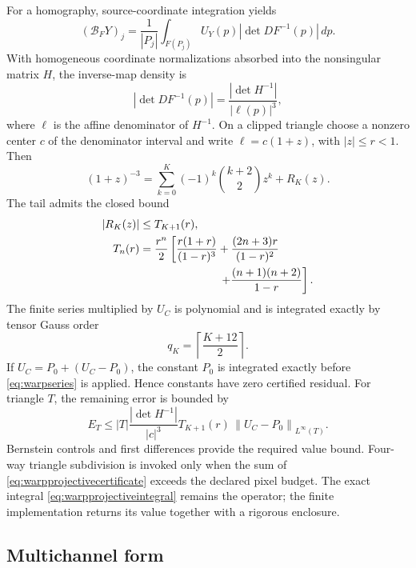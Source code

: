 \documentclass[journal]{IEEEtran}
\newcommand{\norm}[1]{\left\lVert#1\right\rVert}
\begin{document}
For a homography, source-coordinate integration yields
\begin{equation}
 (\mathcal B_FY)_j=\frac1{|P_j|}
 \int_{F(P_j)}U_Y(p)\left|\det DF^{-1}(p)\right|\,dp.
 \label{eq:warpprojectiveintegral}
\end{equation}
With homogeneous coordinate normalizations absorbed into the nonsingular
matrix \(H\), the inverse-map density is
\begin{equation}
 \left|\det DF^{-1}(p)\right|
 =\frac{|\det H^{-1}|}{|\ell(p)|^3},
 \label{eq:warpdensity}
\end{equation}
where \(\ell\) is the affine denominator of \(H^{-1}\).  On a clipped
triangle choose a nonzero center \(c\) of the denominator interval and write
\(\ell=c(1+z)\), with \(|z|\leq r<1\).  Then
\begin{equation}
 (1+z)^{-3}=\sum_{k=0}^{K}(-1)^k\binom{k+2}{2}z^k+R_K(z).
 \label{eq:warpseries}
\end{equation}
The tail admits the closed bound
\begin{align}
 |R_K(z)|&\leq T_{K+1}(r),\label{eq:warptail}\\
 T_n(r)&=\frac{r^n}{2}\left[
 \frac{r(1+r)}{(1-r)^3}
 +\frac{(2n+3)r}{(1-r)^2}\right.\nonumber\\
 &\hspace{25mm}\left.
 +\frac{(n+1)(n+2)}{1-r}\right].\nonumber
\end{align}
The finite series multiplied by \(U_C\) is polynomial and is integrated
exactly by tensor Gauss order
\begin{equation}
 q_K=\left\lceil\frac{K+12}{2}\right\rceil.
 \label{eq:warpseriesorder}
\end{equation}
If \(U_C=P_0+(U_C-P_0)\), the constant \(P_0\) is integrated exactly before
\eqref{eq:warpseries} is applied.  Hence constants have zero certified
residual.  For triangle \(T\), the remaining error is bounded by
\begin{equation}
 E_T\leq |T|\frac{|\det H^{-1}|}{|c|^3}
 T_{K+1}(r)\,
 \norm{U_C-P_0}_{L^\infty(T)}.
 \label{eq:warpprojectivecertificate}
\end{equation}
Bernstein controls and first differences provide the required value bound.
Four-way triangle subdivision is invoked only when the sum of
\eqref{eq:warpprojectivecertificate} exceeds the declared pixel budget.  The
exact integral \eqref{eq:warpprojectiveintegral} remains the operator; the
finite implementation returns its value together with a rigorous enclosure.

\subsection{Multichannel form}
\end{document}
